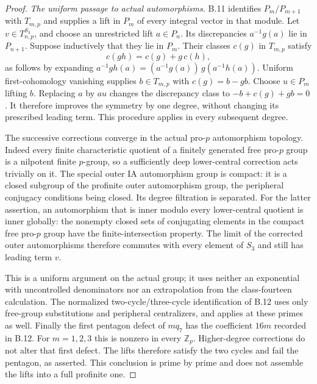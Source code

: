 \begin{proof}
\emph{The uniform passage to actual automorphisms.}
B.11 identifies $P_m/P_{m+1}$ with $T_{m,p}$ and
supplies a lift in $P_m$ of every integral vector in
that module. Let $v\in T_{n,p}^{S_3}$, and choose an
unrestricted lift $a\in P_n$. Its discrepancies
$a^{-1}g(a)$ lie in $P_{n+1}$.
Suppose inductively that they lie in $P_m$.
Their classes $c(g)$ in $T_{m,p}$ satisfy
\[
 c(gh)=c(g)+g\,c(h),
\]
as follows by expanding
$a^{-1}gh(a)=(a^{-1}g(a))\,g(a^{-1}h(a))$.
Uniform first-cohomology vanishing supplies
$b\in T_{m,p}$ with $c(g)=b-gb$.
Choose $u\in P_m$ lifting $b$. Replacing $a$ by $au$
changes the discrepancy class to
$-b+c(g)+gb=0$. It therefore improves the symmetry
by one degree, without changing its prescribed leading
term. This procedure applies in every subsequent degree.

The successive corrections converge in the actual
pro-$p$ automorphism topology. Indeed every finite
characteristic quotient of a finitely generated free
pro-$p$ group is a nilpotent finite $p$-group, so a
sufficiently deep lower-central correction acts trivially
on it. The special outer IA automorphism group is
compact: it is a closed subgroup of the profinite outer
automorphism group, the peripheral conjugacy conditions
being closed. Its degree filtration is separated. For
the latter assertion, an automorphism that is inner
modulo every lower-central quotient is inner globally:
the nonempty closed sets of conjugating elements in
the compact free pro-$p$ group have the finite-intersection
property. The limit of the corrected outer automorphisms
therefore commutes with every element of $S_3$ and
still has leading term $v$.

This is a uniform argument on the actual group; it uses
neither an exponential with uncontrolled denominators
nor an extrapolation from the class-fourteen calculation.
The normalized two-cycle/three-cycle identification of
B.12 uses only free-group substitutions and peripheral
centralizers, and applies at these primes as well.
Finally the first pentagon defect of $m q_7$ has the
coefficient $16m$ recorded in B.12. For $m=1,2,3$ this
is nonzero in every $\mathbb Z_p$. Higher-degree
corrections do not alter that first defect. The lifts
therefore satisfy the two cycles and fail the pentagon,
as asserted. This conclusion is prime by prime and
does not assemble the lifts into a full profinite one.
\end{proof}
